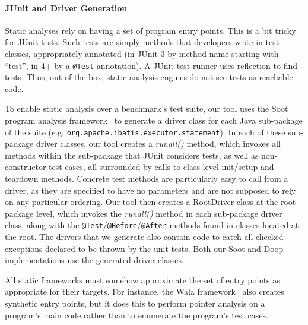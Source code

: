 \paragraph{JUnit and Driver Generation}
Static analyses rely on having a set of program entry points. This is a bit tricky for JUnit tests.
Such tests are simply methods that developers write in test classes, appropriately annotated (in JUnit 3 by method name starting with ``test'', in 4+ by a \texttt{@Test} annotation). A JUnit test runner uses reflection to find tests. Thus, out of the box, static analysis engines do not see tests as reachable code.


To enable static analysis over a benchmark's test suite, our tool uses the Soot program analysis framework~\cite{Vallee-Rai:1999:SJB:781995.782008} to generate a driver class for each Java sub-package of the suite (e.g. \texttt{org.apache.ibatis.executor.statement}). In each of these sub-package driver classes, our tool creates a \textit{runall()} method, which invokes all methods within the sub-package that JUnit considers tests, as well as non-constructor test cases, all surrounded by calls to class-level init/setup and teardown methods. Concrete test methods are particularly easy to call from a driver, as they are specified to have no parameters and are not supposed to rely on any particular ordering. 
Our tool then creates a RootDriver class at the root package level, which invokes the \textit{runall()} method in each sub-package driver class, along with the \texttt{@Test}/\texttt{@Before}/\texttt{@After} methods found in classes located at the root. The drivers that we generate also contain code to catch all checked exceptions declared to be thrown by the unit tests. Both our Soot and Doop implementations use the generated driver classes.

All static frameworks must somehow approximate the set of entry points as appropriate for their targets. For instance, the Wala framework~\cite{wala19:_t} also creates synthetic entry points, but it does this to perform pointer analysis on a program's main code rather than to enumerate the program's test cases.
